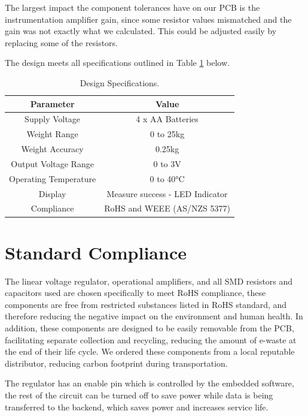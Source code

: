 The largest impact the component tolerances have on our PCB is the instrumentation amplifier gain, since some resistor values mismatched and the gain was not exactly what we calculated. This could be adjusted easily by replacing some of the resistors.

The design meets all specifications outlined in Table \ref{tab:design_spec} below.

\begin{table}[h]
    \centering
    \begin{tabular}{|c|c|}
        \hline
        Parameter & Value \\
        \hline
        Supply Voltage & 4 x AA Batteries \\
        Weight Range & 0 to 25kg \\
        Weight Accuracy & 0.25kg \\
        Output Voltage Range & 0 to 3V \\
        Operating Temperature & 0 to 40°C \\
        Display & Measure success - LED Indicator \\
        Compliance & RoHS and WEEE (AS/NZS 5377) \\
        \hline
    \end{tabular}
    \caption{Design Specifications.}
    \label{tab:design_spec}
\end{table}

\section{Standard Compliance}

The linear voltage regulator, operational amplifiers, and all SMD resistors and capacitors used are chosen specifically to meet RoHS compliance, these components are free from restricted substances listed in RoHS standard, and therefore reducing the negative impact on the environment and human health. In addition, these components are designed to be easily removable from the PCB, facilitating separate collection and recycling, reducing the amount of e-waste at the end of their life cycle. We ordered these components from a local reputable distributor, reducing carbon footprint during transportation.

The regulator has an enable pin which is controlled by the embedded software, the rest of the circuit can be turned off to save power while data is being transferred to the backend, which saves power and increases service life.

